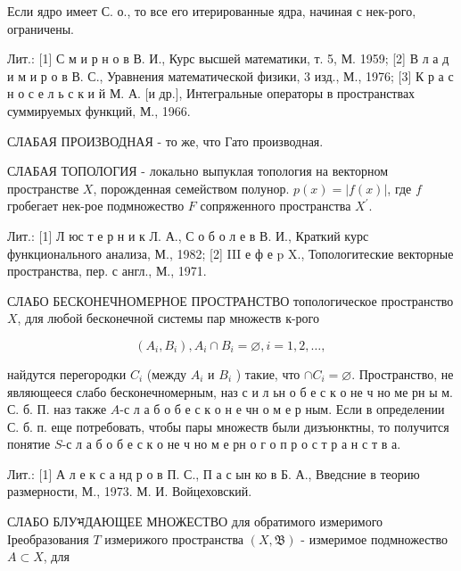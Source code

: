 \documentclass[10pt]{article}
\begin{document}
Если ядро имеет С. о., то все его итерированные ядра, начиная с нек-рого, ограничены.



Лит.: [1] С м и р н о в В. И., Курс высшей математики, т. 5, М. 1959; [2] В л а д и м и р о в В. С., Уравнения математической физики, 3 изд., М., 1976; [3] К р а с н о с е л ь с к и й М. А. [и др.], Интегральные операторы в пространствах суммируемых функций, М., 1966.



СЛАБАЯ ПРОИЗВОДНАЯ - то же, что Гато производная.



СЛАБАЯ ТОПОЛОГИЯ - локально выпуклая топология на векторном пространстве $X$, порожденная семейством полунор. $p(x)=|f(x)|$, где $f$ гробегает нек-рое подмножество $F$ сопряженного пространства $X^{\prime}$.



Лит.: [1] Л юс т е р н и к Л. А., С о б о л е в В. И., Краткий курс функционального анализа, М., 1982; [2] III е ф е p X., Топологитеские векторные пространства, пер. с англ., М., 1971.



СЛАБО БЕСКОНЕЧНОМЕРНОЕ ПРОСТРАНСТВО топологическое пространство $X$, для любой бесконечной системы пар множеств к-рого



\[

\left(A_{i}, B_{i}\right), A_{i} \cap B_{i}=\varnothing, i=1,2, \ldots \text {, }

\]



найдутся перегородки $C_{i}$ (между $A_{i}$ и $B_{i}$ ) такие, что $\cap C_{i}=\varnothing$. Пространство, не являющееся слабо бесконечномерным, наз с и л ьн о б е с к о не ч но ме рн ы м. С. б. П. наз также $A$-с л а б о б е с к о н е чн о м е р ным. Если в определении С. б. п. еще потребовать, чтобы пары множеств были дизъюнктны, то получится понятие $S$-с л а б о б е с к о не ч но м е рн о г о п р о с т р а н с т в а.



Лит.: [1] А л е к с а нд р о в П. С., П а с ын ко в Б. А., Введсние в теорию размерности, М., 1973. М. И. Войцеховский.



СЛАБО БЛУभДАЮЩЕЕ МНОЖЕСТВО для обратимого измеримого Іреобразования $T$ измерижого пространства $(X, \mathfrak{B})$ - измеримое подмножество $A \subset X$, для
\end{document}
